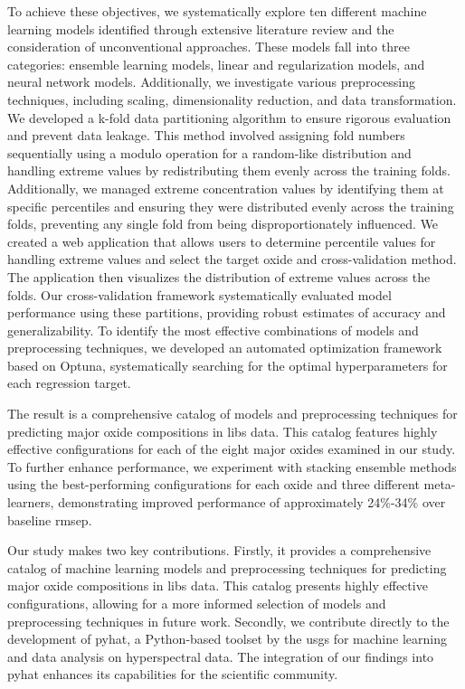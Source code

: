 \vspace{0.5em}

To achieve these objectives, we systematically explore ten different machine learning models identified through extensive literature review and the consideration of unconventional approaches.
These models fall into three categories: ensemble learning models, linear and regularization models, and neural network models.
Additionally, we investigate various preprocessing techniques, including scaling, dimensionality reduction, and data transformation.
We developed a k-fold data partitioning algorithm to ensure rigorous evaluation and prevent data leakage.
This method involved assigning fold numbers sequentially using a modulo operation for a random-like distribution and handling extreme values by redistributing them evenly across the training folds.
Additionally, we managed extreme concentration values by identifying them at specific percentiles and ensuring they were distributed evenly across the training folds, preventing any single fold from being disproportionately influenced.
We created a web application that allows users to determine percentile values for handling extreme values and select the target oxide and cross-validation method. The application then visualizes the distribution of extreme values across the folds.
Our cross-validation framework systematically evaluated model performance using these partitions, providing robust estimates of accuracy and generalizability.
To identify the most effective combinations of models and preprocessing techniques, we developed an automated optimization framework based on Optuna, systematically searching for the optimal hyperparameters for each regression target.

\vspace{0.5em}

The result is a comprehensive catalog of models and preprocessing techniques for predicting major oxide compositions in \gls{libs} data.
This catalog features highly effective configurations for each of the eight major oxides examined in our study.
To further enhance performance, we experiment with stacking ensemble methods using the best-performing configurations for each oxide and three different meta-learners, demonstrating improved performance of approximately 24\%-34\% over baseline \gls{rmsep}.

\vspace{0.5em}

Our study makes two key contributions.
Firstly, it provides a comprehensive catalog of machine learning models and preprocessing techniques for predicting major oxide compositions in \gls{libs} data.
This catalog presents highly effective configurations, allowing for a more informed selection of models and preprocessing techniques in future work.
Secondly, we contribute directly to the development of \gls{pyhat}, a Python-based toolset by the \gls{usgs} for machine learning and data analysis on hyperspectral data.
The integration of our findings into \gls{pyhat} enhances its capabilities for the scientific community.

